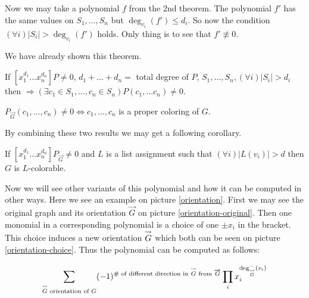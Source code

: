 Now we may take a polynomial $f$ from the 2nd theorem. The polynomial $f'$ has the same values on $S_{1}, \dots, S_{n}$ but $\deg_{v_{i}}(f') \leq d_{i}$. So now the condition $(\forall i) |S_{i}| > \deg_{v_{i}} (f')$ holds. Only thing is to see that $f' \not\equiv 0$.

We have already shown this theorem.

\begin{thm}
	If $[x_{1}^{d_1} \dots x_{n}^{d_n}]P \neq 0$, $d_1 + \dots + d_n = $ total degree of $P$, $S_1, \dots, S_{n}, (\forall i) |S_i| > d_i$ then $\Rightarrow (\exists c_{1} \in S_{1}, \dots, c_{n} \in S_{n}) P(c_{1}, \dots c_n) \neq 0$.
\end{thm}

\begin{observ}
	$P_{\overrightarrow{G}} (c_1, \dots, c_n) \neq 0 \Leftrightarrow c_1, \dots, c_n$ is a proper coloring of $G$.
\end{observ}

By combining these two results we may get a following corollary.

\begin{cor}
	If $[x_{1}^{d_1} \dots x_{n}^{d_n}]P_{\overrightarrow{G}} \neq 0$ and $L$ is a list assignment such that $(\forall i) |L(v_i)| > d$ then $G$ is $L$-colorable.
\end{cor}

Now we will see other variants of this polynomial and how it can be computed in other ways. Here we see an example on picture \ref{orientation}. First we may see the original graph and its orientation $\overrightarrow{G}$ on picture \ref{orientation-original}. Then one monomial in a corresponding polynomial is a choice of one $\pm x_{i}$ in the bracket. This choice induces a new orientation $\mathrel{\overset{\leadsto}{G}}$ which both can be seen on picture \ref{orientation-choice}. Thus the polynomial can be computed as follows:

$$
\sum_{\mathrel{\overset{\leadsto}{G}} \text{ orientation of }G} (-1)^{\text{\# of different direction in } \mathrel{\overset{\leadsto}{G}} \text{ from } \overrightarrow{G}} \prod_{i} x_{i}^{\deg^{-}_{\mathrel{\overset{\leadsto}{G}}}(v_{i})}
$$

